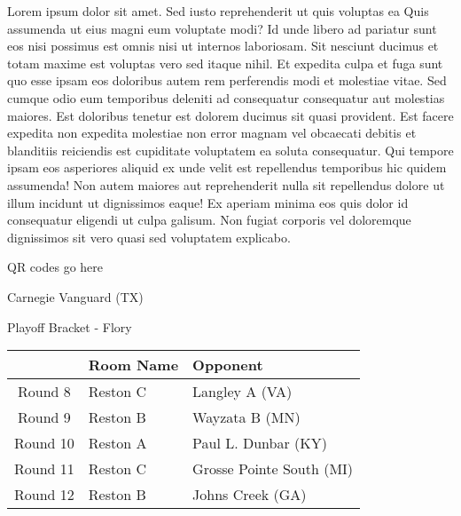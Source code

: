 \documentclass{article}%
\begin{document}
\vspace*{8pt}%
\linebreak%
\newline%
\newline%
Lorem ipsum dolor sit amet. Sed iusto reprehenderit ut quis voluptas ea Quis assumenda ut eius magni eum voluptate modi? Id unde libero ad pariatur sunt eos nisi possimus est omnis nisi ut internos laboriosam. Sit nesciunt ducimus et totam maxime est voluptas vero sed itaque nihil. Et expedita culpa et fuga sunt quo esse ipsam eos doloribus autem rem perferendis modi et molestiae vitae.\newline%
\newline%
Sed cumque odio eum temporibus deleniti ad consequatur consequatur aut molestias maiores. Est doloribus tenetur est dolorem ducimus sit quasi provident. Est facere expedita non expedita molestiae non error magnam vel obcaecati debitis et blanditiis reiciendis est cupiditate voluptatem ea soluta consequatur. Qui tempore ipsam eos asperiores aliquid ex unde velit est repellendus temporibus hic quidem assumenda!\newline%
\newline%
Non autem maiores aut reprehenderit nulla sit repellendus dolore ut illum incidunt ut dignissimos eaque! Ex aperiam minima eos quis dolor id consequatur eligendi ut culpa galisum. Non fugiat corporis vel doloremque dignissimos sit vero quasi sed voluptatem explicabo.\newline%
\newline%
%
\vspace*{30pt}%
\begin{center}%
\begin{Huge}%
QR codes go here%
\end{Huge}%
\end{center}%
\newpage%
\begin{center}%
\begin{Huge}%
Carnegie Vanguard (TX)%
\end{Huge}%
\vspace*{8pt}%
\linebreak%
\begin{Large}%
Playoff Bracket {-} Flory%
\end{Large}%
\end{center}%
%
\begin{tabularx}{\textwidth}{|c|Y|Y|}%
\hline%
&Room Name&Opponent\\%
\hline%
Round 8&Reston C&Langley A (VA)\\%
Round 9&Reston B&Wayzata B (MN)\\%
Round 10&Reston A&Paul L. Dunbar (KY)\\%
Round 11&Reston C&Grosse Pointe South (MI)\\%
Round 12&Reston B&Johns Creek (GA)\\%
\hline%
\end{tabularx}%
\end{document}
